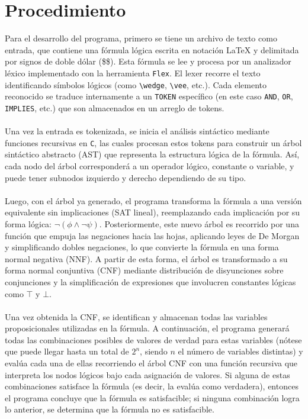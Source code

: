 \documentclass{article}
\begin{document}
%
\section{Procedimiento}
Para el desarrollo del programa, primero se tiene un archivo de texto como entrada, que contiene una fórmula lógica escrita en notación \LaTeX{} y delimitada por signos de doble dólar (\$\$). Esta fórmula se lee y procesa por un analizador léxico implementado con la herramienta \texttt{Flex}. El lexer recorre el texto identificando símbolos lógicos (como \verb|\wedge|, \verb|\vee|, etc.). Cada elemento reconocido se traduce internamente a un \texttt{TOKEN} específico (en este caso \texttt{AND}, \texttt{OR}, \texttt{IMPLIES}, etc.) que son almacenados en un arreglo de tokens.\\\\
Una vez la entrada es tokenizada, se inicia el análisis sintáctico mediante funciones recursivas en \texttt{C}, las cuales procesan estos tokens para construir un árbol sintáctico abstracto (AST) que representa la estructura lógica de la fórmula. Así, cada nodo del árbol corresponderá a un operador lógico, constante o variable, y puede tener subnodos izquierdo y derecho dependiendo de su tipo.\\\\
Luego, con el árbol ya generado, el programa transforma la fórmula a una versión equivalente sin implicaciones (SAT lineal), reemplazando cada implicación por su forma lógica: $\neg(\phi \wedge \neg\psi)$. Posteriormente, este nuevo árbol es recorrido por una función que empuja las negaciones hacia las hojas, aplicando leyes de De Morgan y simplificando dobles negaciones, lo que convierte la fórmula en una forma normal negativa (NNF). A partir de esta forma, el árbol es transformado a su forma normal conjuntiva (CNF) mediante distribución de disyunciones sobre conjunciones y la simplificación de expresiones que involucren constantes lógicas como $\top$ y $\bot$.\\\\
Una vez obtenida la CNF, se identifican y almacenan todas las variables proposicionales utilizadas en la fórmula. A continuación, el programa generará todas las combinaciones posibles de valores de verdad para estas variables (nótese que puede llegar hasta un total de $2^n$, siendo $n$ el número de variables distintas) y evalúa cada una de ellas recorriendo el árbol CNF con una función recursiva que interpreta los nodos lógicos bajo cada asignación de valores. Si alguna de estas combinaciones satisface la fórmula (es decir, la evalúa como verdadera), entonces el programa concluye que la fórmula es satisfacible; si ninguna combinación logra lo anterior, se determina que la fórmula no es satisfacible. \\\\
\end{document}
